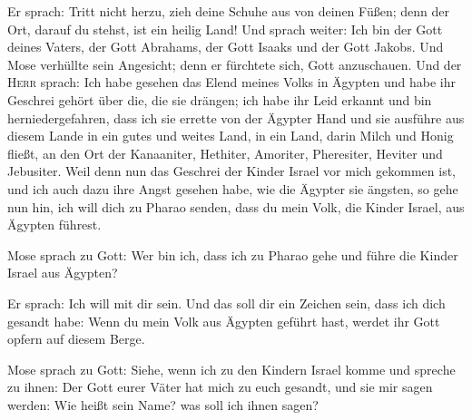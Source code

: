  Er sprach: Tritt nicht herzu, zieh deine Schuhe aus von
deinen Füßen; denn der Ort, darauf du stehst, ist ein heilig Land!
 Und sprach weiter: Ich bin der Gott deines Vaters, der
Gott Abrahams, der Gott Isaaks und der Gott Jakobs. Und Mose verhüllte
sein Angesicht; denn er fürchtete sich, Gott anzuschauen. 
Und der \textsc{Herr} sprach: Ich habe gesehen das Elend meines Volks in
Ägypten und habe ihr Geschrei gehört über die, die sie drängen; ich habe
ihr Leid erkannt  und bin herniedergefahren, dass ich sie
errette von der Ägypter Hand und sie ausführe aus diesem Lande in ein
gutes und weites Land, in ein Land, darin Milch und Honig fließt, an den
Ort der Kanaaniter, Hethiter, Amoriter, Pheresiter, Heviter und
Jebusiter.  Weil denn nun das Geschrei der Kinder Israel
vor mich gekommen ist, und ich auch dazu ihre Angst gesehen habe, wie
die Ägypter sie ängsten,  so gehe nun hin, ich will dich
zu Pharao senden, dass du mein Volk, die Kinder Israel, aus Ägypten
führest.

 Mose sprach zu Gott: Wer bin ich, dass ich zu Pharao
gehe und führe die Kinder Israel aus Ägypten?

 Er sprach: Ich will mit dir sein. Und das soll dir ein
Zeichen sein, dass ich dich gesandt habe: Wenn du mein Volk aus Ägypten
geführt hast, werdet ihr Gott opfern auf diesem Berge.

 Mose sprach zu Gott: Siehe, wenn ich zu den Kindern
Israel komme und spreche zu ihnen: Der Gott eurer Väter hat mich zu euch
gesandt, und sie mir sagen werden: Wie heißt sein Name? was soll ich
ihnen sagen?


